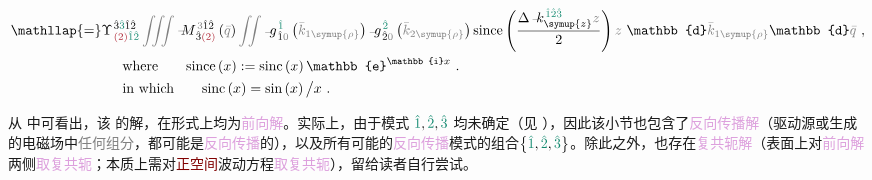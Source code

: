 \begin{subequations}
\begin{align}
	&\mathllap{=} \Upsilon^{\;\! \hat{3} \textcolor{PineGreen}{\hat{3}} \hat{1} \hat{2} }_{\;\! \textcolor{Maroon}{(2)} \textcolor{PineGreen}{\hat{1} \hat{2}} } \mathcolor{gray}{\iiint} \xint{\mathcolor{gray}{-}}{18}{M}^{\;\! \mathcolor{gray}{3} \hat{1} \hat{2} }_{\;\! \hat{3} \textcolor{Maroon}{(2)} } \left( \mathcolor{gray}{\bar{q}} \right) \mathcolor{gray}{\iint} \xint{{}^{}_{\mathcolor{gray}{-}}}{10}{g}^{\;\! \textcolor{PineGreen}{\hat{1}}}_{\;\! \hat{1} \mathcolor{gray}{0}} \left( \mathcolor{gray}{\bar{k}_{1\symup{\rho}}} \right) \xint{{}^{}_{\mathcolor{gray}{-}}}{10}{g}^{\;\! \textcolor{PineGreen}{\hat{2}}}_{\;\! \hat{2} \mathcolor{gray}{0}} \left( \mathcolor{gray}{\bar{k}_{2\symup{\rho}}} \right) \text{since} \left( \frac{ \Delta \xint{\begin{smallmatrix} ~ \\ {}^{}_{\mathcolor{gray}{-}} \\ ~ \end{smallmatrix}}{15}{k}_{\symup{z}}^{\;\! \textcolor{PineGreen}{\hat{1} \hat{2} \hat{3}} } \mathcolor{gray}{z} }{ 2 } \right) \mathcolor{gray}{z} ~ \mathbb{d} \mathcolor{gray}{\bar{k}_{1\symup{\rho}}} \mathbb{d} \mathcolor{gray}{\bar{q}} ~, \label{eq:up-scalar-g-EE-312-discrete-since2} \\
	&\hspace{8em} \text{where} ~~~~~~ \text{since} \left( x \right) := \text{sinc} \left( x \right) \mathbb{e}^{\mathbb{i} x } ~. \label{eq:up-scalar-g-EE-312-discrete-since3} \\
	&\hspace{8em} \text{in which} ~~~~~~ \text{sinc} \left( x \right) = \text{sin} \left( x \right) \big/ x ~. \label{eq:up-scalar-g-EE-312-discrete-since4}
\end{align}
\end{subequations}

从  中可看出，该  的解，在形式上均为\textcolor{Plum}{前向解}。实际上，由于\textcolor{PineGreen}{模式} $\textcolor{PineGreen}{\hat{1}}, \textcolor{PineGreen}{\hat{2}},\textcolor{PineGreen}{\hat{3}}$ 均未确定（见 ），因此该小节也包含了\textcolor{Plum}{反向传播解}（\textcolor{NavyBlue}{驱动源}或生成的电磁场中\textcolor{gray}{任何组分}，都可能是\textcolor{Plum}{反向传播}的），以及所有可能的\textcolor{Plum}{反向传播}\textcolor{PineGreen}{模式}的组合$\left\{ \textcolor{PineGreen}{\hat{1}}, \textcolor{PineGreen}{\hat{2}},\textcolor{PineGreen}{\hat{3}} \right\}$。除此之外，也存在\textcolor{Plum}{复共轭解}（表面上对\textcolor{Plum}{前向解}两侧\textcolor{Plum}{取复共轭}；本质上需对\textcolor{Maroon}{正空间}波动方程\textcolor{Plum}{取复共轭}），留给读者自行尝试。

